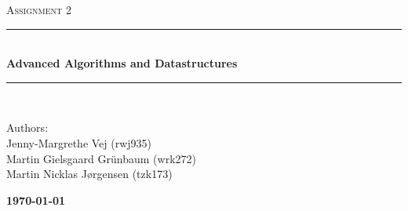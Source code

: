 \documentclass[10pt]{article}
\newcommand{\HRule}{\rule{\linewidth}{0.5mm}}
\begin{document}
\begin{titlepage}

\begin{center}

\textsc{\LARGE Assignment 2}\\%


\HRule \\[0.4cm]

{ \bfseries\large Advanced Algorithms and Datastructures}\\[1cm]

\HRule \\ [7.5cm]

\begin{minipage}{0.5\textwidth}
\begin{flushleft} \large
Authors:\\
Jenny-Margrethe Vej (rwj935)\\
Martin Gielsgaard Grünbaum (wrk272)\\
Martin Nicklas Jørgensen (tzk173)\\
\vspace{0.5cm}
\end{flushleft}
\end{minipage}
\begin{minipage}{0.4\textwidth}
\begin{flushright} {\large
\textbf{\today} }\\
\end{flushright}
\end{minipage}

\vfill



\end{center}

\end{titlepage}
\clearpage






%
%
\end{document}
